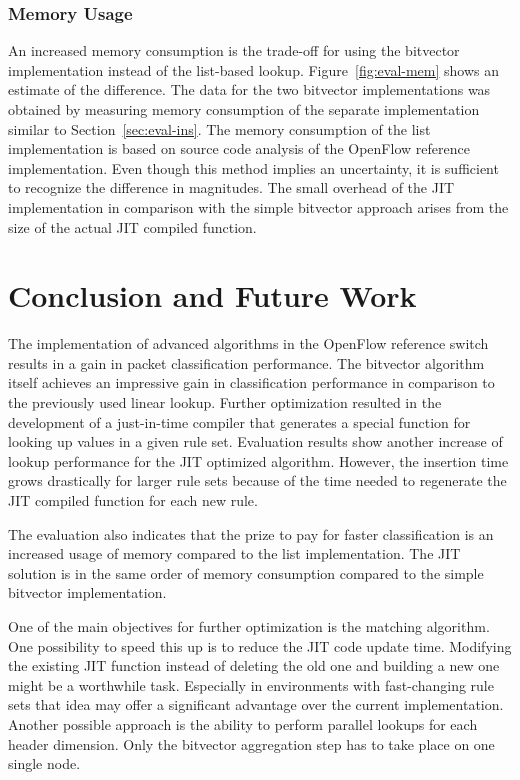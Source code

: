 \documentclass[conference]{IEEEtran}
\begin{document}
\subsubsection{Memory Usage}
An increased memory consumption is the trade-off for using the bitvector implementation
instead of the list-based lookup.
Figure~\ref{fig:eval-mem} shows an estimate of the difference.
The data for the two bitvector implementations was obtained by measuring memory consumption of the separate implementation
similar to Section~\ref{sec:eval-ins}.
The memory consumption of the list implementation is based on source code analysis of the 
OpenFlow reference implementation.
Even though this method implies an uncertainty, it is sufficient to recognize the difference in magnitudes.
The small overhead of the JIT implementation in comparison with the simple bitvector approach
arises from the size of the actual JIT compiled function.

\section{Conclusion and Future Work}
The implementation of advanced algorithms in the OpenFlow reference switch 
results in a gain in packet classification performance.
The bitvector algorithm itself achieves an impressive gain in classification 
performance in comparison to the previously used linear lookup.
Further optimization resulted in the development of a just-in-time compiler 
that generates a special function for looking up values in a given rule set.
Evaluation results show another increase of lookup performance for the JIT optimized algorithm.
However, the insertion time grows drastically for larger rule sets because 
of the time needed to regenerate the JIT compiled function for each new rule.

The evaluation also indicates that the prize to pay for faster classification 
is an increased usage of memory compared to the list implementation.
The JIT solution is in the same order of memory consumption 
compared to the simple bitvector implementation. 

One of the main objectives for further optimization is the matching algorithm.
One possibility to speed this up is to reduce the JIT code update time.
Modifying the existing JIT function instead of deleting the old one and building 
a new one might be a worthwhile task.
Especially in environments with fast-changing rule sets that idea may offer 
a significant advantage over the current implementation.
Another possible approach is the ability to perform parallel lookups for each header dimension.
Only the bitvector aggregation step has to take place on one single node.
\end{document}
